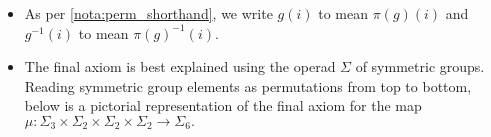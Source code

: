 \begin{rem}
\begin{itemize}
\item As per \cref{nota:perm_shorthand}, we write $g(i)$ to mean $\pi(g)(i)$ and $g^{-1}(i)$ to mean $\pi(g)^{-1}(i)$.  
\item The final axiom is best explained using the operad $\Sigma$ of symmetric groups. Reading symmetric group elements as permutations from top to bottom, below is a pictorial representation of the final axiom for the map $\mu \colon \Sigma_{3} \times \Sigma_{2} \times \Sigma_{2} \times \Sigma_{2} \rightarrow \Sigma_{6}.$

\end{itemize}
\end{rem}
